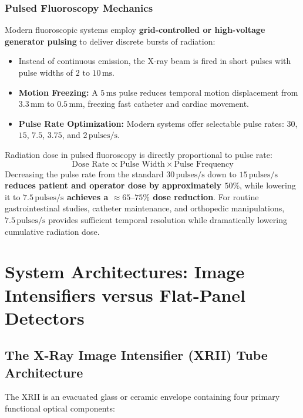 \documentclass[11pt,a4paper]{article}
\begin{document}
\subsubsection{Pulsed Fluoroscopy Mechanics}
Modern fluoroscopic systems employ \textbf{grid-controlled or high-voltage generator pulsing} to deliver discrete bursts of radiation:
\begin{itemize}[leftmargin=*]
    \item Instead of continuous emission, the X-ray beam is fired in short pulses with pulse widths of \textbf{$2\text{ to }10\,\text{ms}$}.
    \item \textbf{Motion Freezing:} A $5\,\text{ms}$ pulse reduces temporal motion displacement from $3.3\,\text{mm}$ to $0.5\,\text{mm}$, freezing fast catheter and cardiac movement.
    \item \textbf{Pulse Rate Optimization:} Modern systems offer selectable pulse rates: $30$, $15$, $7.5$, $3.75$, and $2\,\text{pulses/s}$.
\end{itemize}

\begin{radiationphysics}
Radiation dose in pulsed fluoroscopy is directly proportional to pulse rate:
\begin{equation}
    \text{Dose Rate} \propto \text{Pulse Width} \times \text{Pulse Frequency}
\end{equation}
Decreasing the pulse rate from the standard $30\,\text{pulses/s}$ down to \textbf{$15\,\text{pulses/s}$ reduces patient and operator dose by approximately $50\%$}, while lowering it to \textbf{$7.5\,\text{pulses/s}$ achieves a $\approx 65\text{--}75\%$ dose reduction}. For routine gastrointestinal studies, catheter maintenance, and orthopedic manipulations, $7.5\,\text{pulses/s}$ provides sufficient temporal resolution while dramatically lowering cumulative radiation dose.
\end{radiationphysics}

\section{System Architectures: Image Intensifiers versus Flat-Panel Detectors}

\subsection{The X-Ray Image Intensifier (XRII) Tube Architecture}

The XRII is an evacuated glass or ceramic envelope containing four primary functional optical components:
\end{document}

